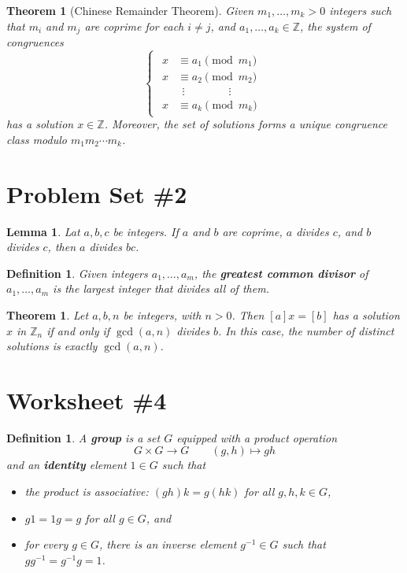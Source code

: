 \documentclass[12pt]{amsart}
\newcommand{\Z}{\mathbb{Z}}
\numberwithin{equation}{section}
\theoremstyle{plain} %
\newtheorem{thm}	[section]	{Theorem}
\newtheorem{lem}	[section]	{Lemma}
\newtheorem{defn}	[section]	{Definition}
\begin{document}
 \begin{thm}[Chinese Remainder Theorem]
 Given $m_1,\dots,m_k >0$ integers such that $m_i$ and $m_j$ are coprime for each $i\neq j$, and $a_1,\dots,a_k\in \Z$, the system of congruences
\[ \begin{cases} \begin{aligned} 
x &\equiv a_1 \pmod{m_1}  \\
x &\equiv a_2 \pmod{m_2}  \\
&\ \ \vdots \qquad \qquad \vdots\\
x &\equiv a_k \pmod{m_k}
\end{aligned}\end{cases}\]
has a solution $x\in \Z$. Moreover, the set of solutions forms a unique congruence class modulo $m_1 m_2 \cdots m_k$.
\end{thm}

\section*{Problem Set \#2}

\begin{lem} Lat $a,b,c$ be integers. If $a$ and $b$ are coprime, $a$ divides $c$, and $b$ divides $c$, then $a$ divides $bc$.
\end{lem}

\begin{defn}  Given integers $a_1,\dots,a_m$, the \textbf{greatest common divisor} of $a_1,\dots,a_m$ is the largest integer that divides all of them. 
\end{defn}

\begin{thm} Let $a,b,n$ be integers, with $n>0$. Then $[a] x = [b]$ has a solution $x$ in $\Z_n$ if and only if $\gcd(a,n)$ divides $b$. In this case, the number of distinct solutions is exactly $\gcd(a,n)$.
\end{thm}

\section*{Worksheet \#4}

\begin{defn} A \textbf{group} is a set $G$ equipped with a product operation \[ G\times G \to G \qquad (g,h)\mapsto gh \] and an \textbf{identity} element $1\in G$ such that
\begin{itemize}
\item the product is associative: $(gh)k = g(hk)$ for all $g,h,k\in G$,
\item $g1 = 1g = g$ for all $g\in G$, and
\item for every $g\in G$, there is an inverse element $g^{-1}\in G$ such that $gg^{-1} = g^{-1} g = 1$.
\end{itemize}
\end{defn}
\end{document}
